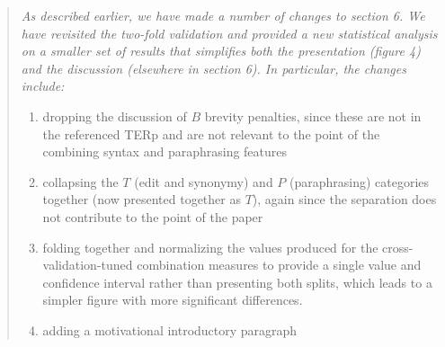 \documentclass[letterpaper,12pt]{article}
\newenvironment{response}
{\begin{quotation} \it}
  {\end{quotation}}
\begin{document}
\begin{response}
  As described earlier, we have made a number of changes to section 6.  We have
  revisited the two-fold validation and provided a new statistical
  analysis on a smaller set of results that simplifies both the presentation (figure 4) and the
  discussion (elsewhere in section 6). In particular, the changes
  include:
  \begin{enumerate}
  \item dropping the discussion of $B$ brevity penalties, since these are not in the  referenced TERp and are not relevant to the point of the combining
    syntax and paraphrasing features
  \item collapsing the $T$ (edit and synonymy) and $P$ (paraphrasing)
    categories together (now presented together as $T$), again since the
    separation does not contribute to the point of the paper
  \item folding together and normalizing the values produced for the
    cross-validation-tuned combination measures to provide a single value and
    confidence interval rather than presenting both splits, which leads to a simpler 
    figure with more significant differences.
  \item adding a motivational introductory paragraph
  \end{enumerate}
\end{response}
\end{document}
